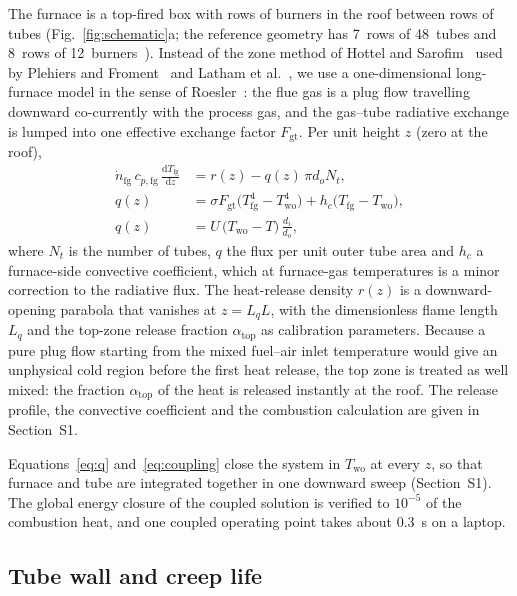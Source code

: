 \documentclass[final,3p,times]{elsarticle}
\begin{document}
The furnace is a top-fired box with rows of burners in the roof between rows of tubes (Fig.~\ref{fig:schematic}a; the reference geometry has 7~rows of 48~tubes and 8~rows of 12~burners~\cite{latham2011}). Instead of the zone method of Hottel and Sarofim~\cite{hottel1967} used by Plehiers and Froment~\cite{plehiers1989} and Latham et al.~\cite{latham2011}, we use a one-dimensional long-furnace model in the sense of Roesler~\cite{roesler1967}: the flue gas is a plug flow travelling downward co-currently with the process gas, and the gas--tube radiative exchange is lumped into one effective exchange factor $F_{\mathrm{gt}}$. Per unit height $z$ (zero at the roof),
\begin{align}
\dot n_{\mathrm{fg}}\,c_{p,\mathrm{fg}}\,\frac{\mathrm{d}T_{\mathrm{fg}}}{\mathrm{d}z} &= r(z) - q(z)\,\pi d_o N_t, \label{eq:fg}\\
q(z) &= \sigma F_{\mathrm{gt}}\big(T_{\mathrm{fg}}^4 - T_{\mathrm{wo}}^4\big) + h_c\big(T_{\mathrm{fg}} - T_{\mathrm{wo}}\big), \label{eq:q}\\
q(z) &= U\,\big(T_{\mathrm{wo}} - T\big)\,\frac{d_i}{d_o}, \label{eq:coupling}
\end{align}
where $N_t$ is the number of tubes, $q$ the flux per unit outer tube area and $h_c$ a furnace-side convective coefficient, which at furnace-gas temperatures is a minor correction to the radiative flux. The heat-release density $r(z)$ is a downward-opening parabola that vanishes at $z = L_q L$, with the dimensionless flame length $L_q$ and the top-zone release fraction $\alpha_{\mathrm{top}}$ as calibration parameters. Because a pure plug flow starting from the mixed fuel--air inlet temperature would give an unphysical cold region before the first heat release, the top zone is treated as well mixed: the fraction $\alpha_{\mathrm{top}}$ of the heat is released instantly at the roof. The release profile, the convective coefficient and the combustion calculation are given in Section~S1.

Equations~\eqref{eq:q} and~\eqref{eq:coupling} close the system in $T_{\mathrm{wo}}$ at every $z$, so that furnace and tube are integrated together in one downward sweep (Section~S1). The global energy closure of the coupled solution is verified to $10^{-5}$ of the combustion heat, and one coupled operating point takes about 0.3~s on a laptop.

\subsection{Tube wall and creep life}
\label{sec:creep}
\end{document}
